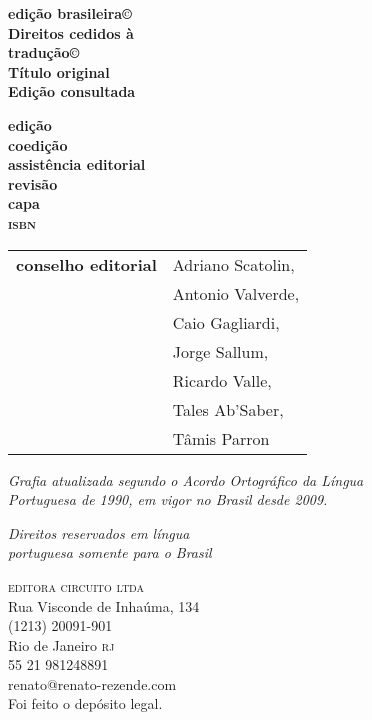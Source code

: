 \newcommand{\linha}[2]{\ifdef{#2}{\linhalayout{#1}{#2}}{}}

\begingroup\tiny
\parindent=0cm
\thispagestyle{empty}

\textbf{edição brasileira©}\\
\textbf{Direitos cedidos à}\\
\textbf{tradução©}\\
\textbf{Título original}\\
\textbf{Edição consultada}

\textbf{edição}\\
\textbf{coedição}\\
\textbf{assistência editorial}\\
\textbf{revisão}\\
\textbf{capa}\\

\textbf{\textsc{isbn}}

\hspace{-5pt}\begin{tabular}{ll}
\textbf{conselho editorial} & Adriano Scatolin,  \\
							& Antonio Valverde,  \\
							& Caio Gagliardi,    \\
							& Jorge Sallum,      \\
							& Ricardo Valle,     \\
							& Tales Ab'Saber,    \\
							& Tâmis Parron      
\end{tabular}

\bigskip
 
\textit{Grafia atualizada segundo o Acordo Ortográfico da Língua\\
Portuguesa de 1990, em vigor no Brasil desde 2009.}\\

\vfill

\textit{Direitos reservados em língua\\ 
portuguesa somente para o Brasil}\\\smallskip

\textsc{editora circuito ltda}\\
Rua Visconde de Inhaúma, 134\\
(1213) 20091-901\\
Rio de Janeiro \textsc{rj}\\
55 21 981248891\\
renato@renato-rezende.com\\
\bigskip
Foi feito o depósito legal.

\endgroup
\pagebreak